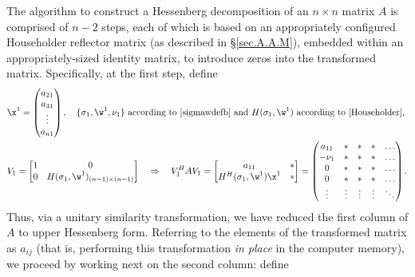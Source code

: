 The algorithm to construct a Hessenberg decomposition of an $n\times
n$ matrix $A$ is comprised of $n-2$ steps, each of which is based
on an appropriately configured Householder reflector matrix (as
described in \S \ref{sec.A.A.M}), embedded within an appropriately-sized identity matrix, to introduce zeros into the
transformed matrix.  Specifically, at the first step, define
\begin{align*}
    &\x^{1}=\begin{pmatrix} a_{21} \\ a_{31} \\ \vdots \\ a_{n1} \end{pmatrix}, \quad
    \textrm{$\{\sigma_{1},\w^{1},\nu_{1}\}$ according to \eqref{sigmawdefb} and $H(\sigma_{1},\w^{1})$
    according to \eqref{Householder},}\\
    &V_{1}=\begin{bmatrix} 1 & 0 \\ 0 & H(\sigma_{1},\w^{1})_{(n-1)\times (n-1)} \end{bmatrix}
    \quad \Rightarrow \quad
    V_{1}^{H}A V_{1}=\begin{bmatrix} a_{11} & * \\ H^{H}(\sigma_{1},\w^{1})\x^{1} & * \end{bmatrix} =
    \begin{pmatrix} a_{11}     & * & * & * & \hdots \\
				      -\nu_{1} & * & * & * & \hdots \\
				      0          & * & * & * & \hdots \\
				      0          & * & * & * & \hdots \\
				      \vdots     & \vdots & \vdots & \vdots & \ddots \end{pmatrix}.
\end{align*}
Thus, via a unitary similarity transformation, we have reduced the first
column of $A$ to upper Hessenberg form.  Referring to the elements of the
transformed matrix as $a_{ij}$ (that is, performing this
transformation {\it in place} in the computer memory), we proceed by
working next on the second column: define
\clearpage
